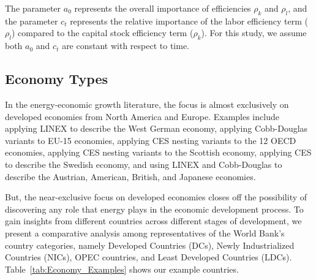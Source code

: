 \documentclass[preprint,authoryear,12pt]{elsarticle}\usepackage[]{graphicx}\usepackage[]{color}
\begin{document}
The parameter $a_0$ represents the overall importance of efficiencies $\rho_k$ and $\rho_l$, 
and the parameter $c_t$ represents the relative importance 
of the labor efficiency term ($\rho_l$) compared to the capital stock efficiency term ($\rho_k$). 
For this study, 
we assume both $a_0$ and $c_t$ are constant 
with respect to time. 


\subsection{Economy Types} 
\label{sec:Economy_Types}

In the energy-economic growth literature, the focus is 
almost exclusively on developed economies from North America 
and Europe. 
Examples include \citet{Kummel:1980wx} applying 
LINEX to describe the West German economy, 
\citet{Serrenho:2010vq} applying Cobb-Douglas variants to EU-15 economies, 
\citet{VanderWerf:2008tc} applying CES nesting variants 
to the 12 OECD economies, 
\citet{Lecca:2011kr} applying CES nesting variants to the Scottish economy, 
\citet{Stern:2012ey} applying CES to describe the Swedish economy, 
and \citet{Warr:2012cg} using LINEX and Cobb-Douglas to describe the Austrian, 
American, British, and Japanese economies.

But, the near-exclusive focus on developed economies closes off 
the possibility of discovering any role that energy plays 
in the economic development process. 
To gain insights from different countries 
across different stages of development, 
we present a comparative analysis among representatives of
the World Bank's country categories, 
namely Developed Countries (DCs), 
Newly Industrialized Countries (NICs), 
OPEC countries, and 
Least Developed Countries (LDCs). 
Table~\ref{tab:Economy_Examples} shows our example countries.
\end{document}
